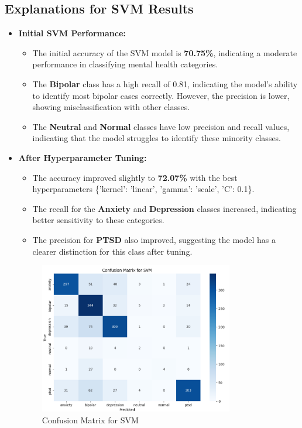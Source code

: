 \subsection{Explanations for SVM Results}

\begin{itemize}
    \item \textbf{Initial SVM Performance:}
    \begin{itemize}
        \item The initial accuracy of the SVM model is \textbf{70.75\%}, indicating a moderate performance in classifying mental health categories.
        \item The \textbf{Bipolar} class has a high recall of 0.81, indicating the model's ability to identify most bipolar cases correctly. However, the precision is lower, showing misclassification with other classes.
        \item The \textbf{Neutral} and \textbf{Normal} classes have low precision and recall values, indicating that the model struggles to identify these minority classes.
    \end{itemize}

    \item \textbf{After Hyperparameter Tuning:}
    \begin{itemize}
        \item The accuracy improved slightly to \textbf{72.07\%} with the best hyperparameters \{'kernel': 'linear', 'gamma': 'scale', 'C': 0.1\}.
        \item The recall for the \textbf{Anxiety} and \textbf{Depression} classes increased, indicating better sensitivity to these categories.
        \item The precision for \textbf{PTSD} also improved, suggesting the model has a clearer distinction for this class after tuning.
    \end{itemize}

    \begin{figure}[h!]  
    \centering
    \includegraphics[width=0.8\textwidth]{Images/Confusion Matrix SVM.png}  
    \caption{Confusion Matrix for SVM}
    \label{Confusion Matrix SVM}  %
    \end{figure}


\end{itemize}
